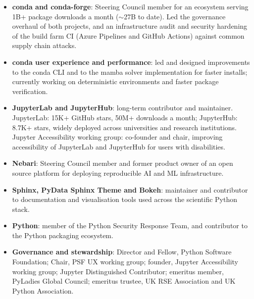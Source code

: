 
\begin{cvparagraph}
\begin{itemize}[leftmargin=2ex, nosep, noitemsep, label=\textbullet]
  \item \textbf{conda and conda-forge}: Steering Council member for an ecosystem serving 1B+ package downloads a month ($\sim$27B to date). Led the governance overhaul of both projects, and an infrastructure audit and security hardening of the build farm CI (Azure Pipelines and GitHub Actions) against common supply chain attacks.
  \item \textbf{conda user experience and performance}: led and designed improvements to the conda CLI and to the mamba solver implementation for faster installs; currently working on deterministic environments and faster package verification.
  \item \textbf{JupyterLab and JupyterHub}: long-term contributor and maintainer. JupyterLab: 15K+ GitHub stars, 50M+ downloads a month; JupyterHub: 8.7K+ stars, widely deployed across universities and research institutions. Jupyter Accessibility working group: co-founder and chair, improving accessibility of JupyterLab and JupyterHub for users with disabilities.
  \item \textbf{Nebari}: Steering Council member and former product owner of an open source platform for deploying reproducible AI and ML infrastructure.
  \item \textbf{Sphinx, PyData Sphinx Theme and Bokeh}: maintainer and contributor to documentation and visualisation tools used across the scientific Python stack.
  \item \textbf{Python}: member of the Python Security Response Team, and contributor to the Python packaging ecosystem.
  \item \textbf{Governance and stewardship}: Director and Fellow, Python Software Foundation; Chair, PSF UX working group; founder, Jupyter Accessibility working group; Jupyter Distinguished Contributor; emeritus member, PyLadies Global Council; emeritus trustee, UK RSE Association and UK Python Association.
\end{itemize}
\end{cvparagraph}
